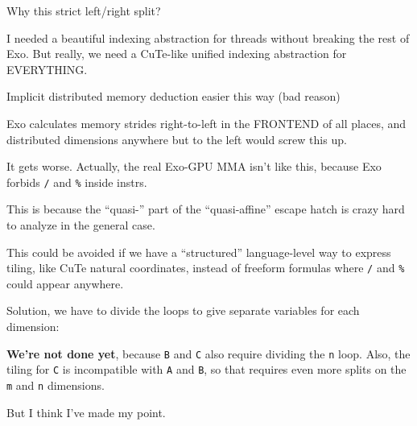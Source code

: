 \newpage
{}

{\LARGE

 Why this strict left/right split?

}

{\large

}

{\LARGE

I needed a beautiful indexing abstraction for threads without breaking the rest of Exo.
But really, we need a CuTe-like unified indexing abstraction for EVERYTHING.

Implicit distributed memory deduction easier this way (bad reason)

Exo calculates memory strides right-to-left in the FRONTEND of all places, and distributed dimensions anywhere but to the left would screw this up.

}

\newpage
{}

{\LARGE

It gets worse.
Actually, the real Exo-GPU MMA isn't like this, because Exo forbids \texttt{/} and \texttt{\%} inside instrs.

}

{\large

}

{\LARGE

This is because the ``quasi-'' part of the ``quasi-affine'' escape hatch is crazy hard to analyze in the general case.

This could be avoided if we have a ``structured'' language-level way to express tiling, like CuTe natural coordinates, instead of freeform formulas where \texttt{/} and \texttt{\%} could appear anywhere.

}

\newpage
{}

{\LARGE

Solution, we have to divide the loops to give separate variables for each dimension:

}

{\large

}

{\LARGE

\textbf{We're not done yet}, because \texttt{B} and \texttt{C} also require dividing the \texttt{n} loop.
Also, the tiling for \texttt{C} is incompatible with \texttt{A} and \texttt{B}, so that requires even more splits on the \texttt{m} and \texttt{n} dimensions.

\vfill

But I think I've made my point.

}

